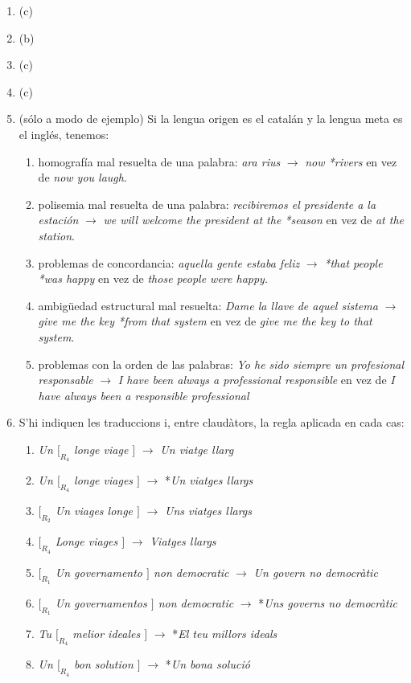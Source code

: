 \begin{enumerate}
\item (c) \item (b) \item (c) \item (c) 

\item (sólo a modo de ejemplo) Si la lengua origen es el catalán y la lengua meta es el inglés, tenemos: \begin{enumerate} \item homografía mal resuelta de una palabra: \emph{ara rius} $\to$ \emph{now *rivers} en vez de \emph{now you laugh}. \item polisemia mal resuelta de una palabra: \emph{recibiremos el presidente a la estación} $\to$ \emph{we will welcome the president at the *season} en vez de \emph{at the station}. \item problemas de concordancia: \emph{aquella gente estaba feliz} $\to$ \emph{*that people *was happy} en vez de  \emph{those people were happy}. \item ambigüedad estructural mal resuelta: \emph{Dame la llave de aquel sistema} $\to$ \emph{give me the key *from that system} en vez de  \emph{give me the key to that system}. \item problemas con la orden de las palabras: \emph{Yo he sido siempre un profesional responsable} $\to$ \emph{I have been always a professional responsible} en vez de \emph{I have always been a responsible professional} \end{enumerate} 

\item S'hi indiquen les traduccions i, entre claudàtors, la regla aplicada en cada cas: \begin{enumerate} \item \emph{Un $[_{R_4}$ longe viage $]$} $\to$ \emph{Un viatge llarg} \item \emph{Un $[_{R_4}$ longe viages $]$} $\to$ *\emph{Un viatges llargs} \item \emph{$[_{R_2}$ Un viages longe $]$} $\to$ \emph{Uns viatges llargs} \item \emph{$[_{R_4}$ Longe viages $]$} $\to$ \emph{Viatges llargs} \item \emph{$[_{R_1}$ Un governamento $]$ non democratic} $\to$ \emph{Un govern no democràtic} \item \emph{$[_{R_1}$ Un governamentos $]$ non democratic} $\to$ *\emph{Uns governs no democràtic} \item \emph{Tu $[_{R_4}$ melior ideales $]$} $\to$ *\emph{El teu millors ideals} \item \emph{Un $[_{R_4}$ bon solution $]$} $\to$ *\emph{Un bona solució} \end{enumerate} 


\end{enumerate}
